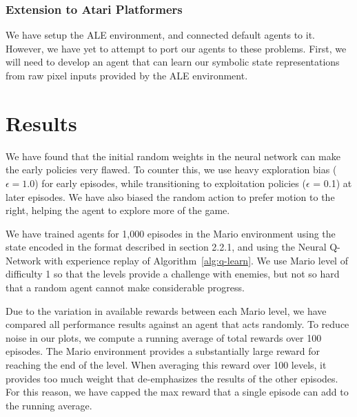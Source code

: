 \documentclass{article}
\begin{document}
\subsubsection{Extension to Atari Platformers}
We have setup the ALE environment, and connected default agents to it. However, we have yet to attempt to port our agents to these problems. First, we will need to develop an agent that can learn our symbolic state representations from raw pixel inputs provided by the ALE environment.
 
 \section{Results}
 
We have found that the initial random weights in the neural network can make the early policies very flawed. To counter this, we use heavy exploration bias ($\epsilon = 1.0$) for early episodes, while transitioning to exploitation policies ($\epsilon$ = 0.1) at later episodes. We have also biased the random action to prefer motion to the right, helping the agent to explore more of the game. 

We have trained agents for 1,000 episodes in the Mario environment using the state encoded in the format described in section 2.2.1, and using the Neural Q-Network with experience replay of Algorithm~\ref{alg:q-learn}. We use Mario level of difficulty 1 so that the levels provide a challenge with enemies, but not so hard that a random agent cannot make considerable progress.
 
Due to the variation in available rewards between each Mario level, we have compared all performance results against an agent that acts randomly. To reduce noise in our plots, we compute a running average of total rewards over 100 episodes. The Mario environment provides a substantially large reward for reaching the end of the level. When averaging this reward over 100 levels, it provides too much weight that de-emphasizes the results of the other episodes. For this reason, we have capped the max reward that a single episode can add to the running average.
 
\end{document}
